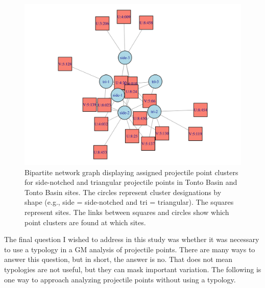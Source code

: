 \documentclass[letterpaper]{article}
\begin{document}
\begin{figure}
\includegraphics[width=1\linewidth]{figures/TontoClusterNetwork} \caption{Bipartite network graph displaying assigned projectile point clusters for side-notched and triangular projectile points in Tonto Basin and Tonto Basin sites. The circles represent cluster designations by shape (e.g., side = side-notched and tri = triangular). The squares represent sites. The links between squares and circles show which point clusters are found at which sites.}\label{fig:TontoClusterNetwork}
\end{figure}

The final question I wished to address in this study was whether it was necessary to use a typology in a GM analysis of projectile points. There are many ways to answer this question, but in short, the answer is no. That does not mean typologies are not useful, but they can mask important variation. The following is one way to approach analyzing projectile points without using a typology.
\end{document}
